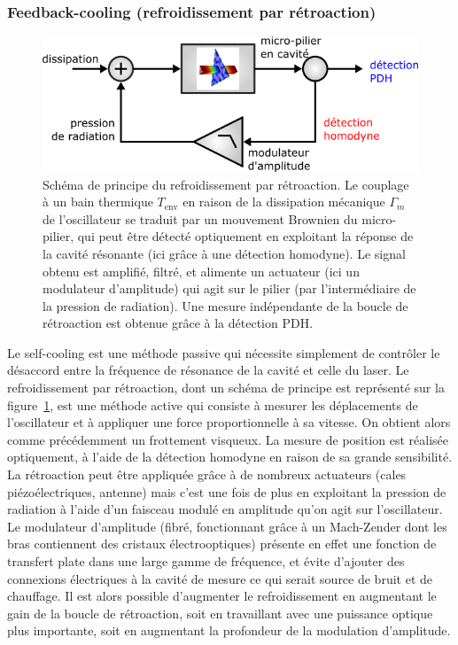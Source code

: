 \documentclass[12pt,a4paper]{article}
\begin{document}
\subsubsection{Feedback-cooling (refroidissement par rétroaction)}

\begin{figure}
\center
\includegraphics[scale=0.5]{figures/feedback_cooling.png}
\caption{Schéma de principe du refroidissement par rétroaction.
Le couplage à un bain thermique $T_\mathrm{env}$ en raison de la dissipation mécanique $\Gamma_m$ de l'oscillateur se traduit par un mouvement Brownien du micro-pilier, qui peut être détecté optiquement en exploitant la réponse de la cavité résonante (ici grâce à une détection homodyne).
Le signal obtenu est amplifié, filtré, et alimente un actuateur (ici un modulateur d'amplitude) qui agit sur le pilier (par l'intermédiaire de la pression de radiation).
Une mesure indépendante de la boucle de rétroaction est obtenue grâce à la détection PDH.}
\label{fig:feedback_scheme}
\end{figure}

Le self-cooling est une méthode passive qui nécessite \og simplement \fg{} de contrôler le désaccord entre la fréquence de résonance de la cavité et celle du laser.
Le refroidissement par rétroaction, dont un schéma de principe est représenté sur la figure~\ref{fig:feedback_scheme}, est une méthode active qui consiste à mesurer les déplacements de l'oscillateur et à appliquer une force proportionnelle à sa vitesse.
On obtient alors comme précédemment un frottement visqueux.
La mesure de position est réalisée optiquement, à l'aide de la détection homodyne en raison de sa grande sensibilité.
La rétroaction peut être appliquée grâce à de nombreux actuateurs (cales piézoélectriques, antenne) mais c'est une fois de plus en exploitant la pression de radiation à l'aide d'un faisceau modulé en amplitude qu'on agit sur l'oscillateur.
Le modulateur d'amplitude (fibré, fonctionnant grâce à un Mach-Zender dont les bras contiennent des cristaux électrooptiques) présente en effet une fonction de transfert plate dans une large gamme de fréquence, et évite d'ajouter des connexions électriques à la cavité de mesure ce qui serait source de bruit et de chauffage.
Il est alors possible d'augmenter le refroidissement en augmentant le gain de la boucle de rétroaction, soit en travaillant avec une puissance optique plus importante, soit en augmentant la profondeur de la modulation d'amplitude.
\end{document}
